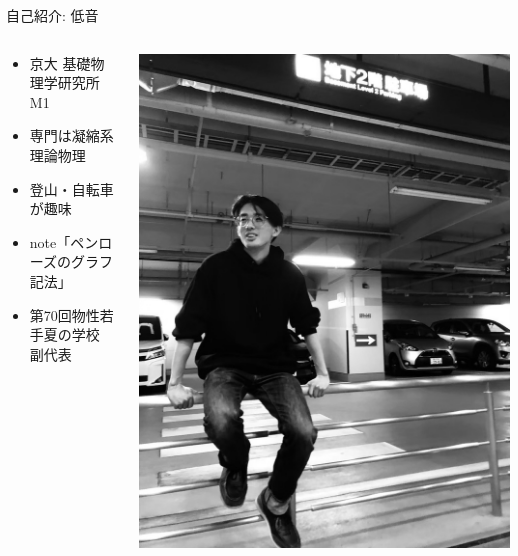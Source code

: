 \documentclass[dvipdfm]{beamer}
\begin{document}
\begin{frame}{自己紹介: 低音}
    \begin{columns}
        \begin{column}{0.6\textwidth}
            \begin{itemize}
                \item 京大 基礎物理学研究所 M1
                \item 専門は凝縮系理論物理
                \item 登山・自転車が趣味
                \item note「ペンローズのグラフ記法」
                \item 第70回物性若手夏の学校 副代表
            \end{itemize}
        \end{column}
        \begin{column}{0.3\textwidth}
            \includegraphics[width=1.2\linewidth]{38A299D4-7495-44B7-B699-E1AF92AFC245_1_105_c.jpeg}
        \end{column}
    \end{columns}
\end{frame}
\end{document}

